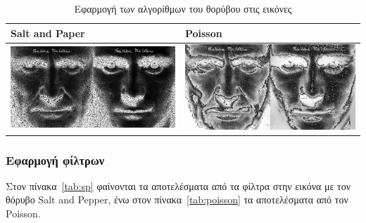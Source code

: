 \newpage
\begin{table}
	\begin{tabular}{| p{8cm} | p{8cm}|}
		\hline
		\textbf{Salt and Paper} & \textbf{Poisson} \\
		\hline
		\includegraphics[width=\linewidth]{Figures/sp_noise} &
		\includegraphics[width=\linewidth]{Figures/poisson_noise} \\
		\hline
	\end{tabular}
	\label{tab:noise}
	\caption{Εφαρμογή των αλγορίθμων του θορύβου στις εικόνες}
\end{table}

\newpage
\subsubsection{Εφαρμογή φίλτρων}

Στον πίνακα~\ref{tab:sp} φαίνονται τα αποτελέσματα από τα φίλτρα στην εικόνα με τον θόρυβο Salt and Pepper, ένω στον πίνακα~\ref{tab:poisson} τα αποτελέσματα από τον Poisson.


